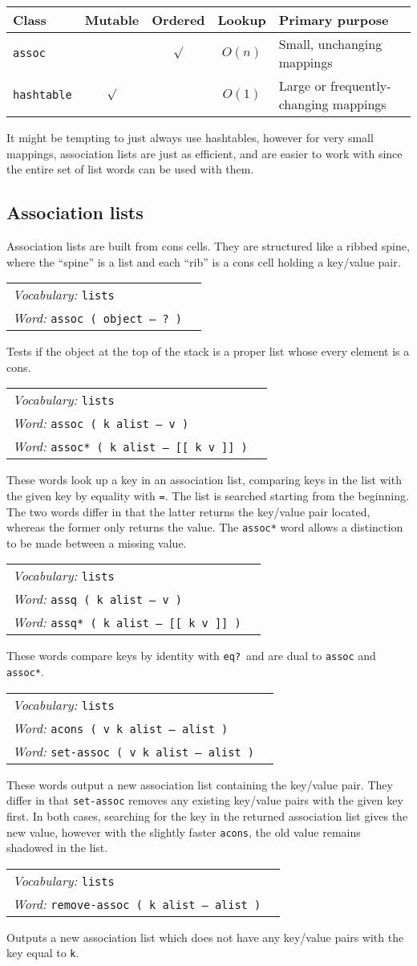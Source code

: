\documentclass{book}
\newcommand{\vocabulary}[1]{\emph{Vocabulary:} \texttt{#1}&\\}
\newcommand{\ordinaryword}[2]{\index{\texttt{#1}}\emph{Word:} \texttt{#2}&\\}
\newcommand{\wordtable}[1]{


\begin{tabularx}{12cm}{lX}
\hline
#1
\hline
\end{tabularx}

}
\begin{document}
\begin{tabular}[t]{l|c|c|c|l}
Class&Mutable&Ordered&Lookup&Primary purpose\\
\hline
\texttt{assoc}&&$\surd$&$O(n)$&Small, unchanging mappings\\
\texttt{hashtable}&$\surd$&&$O(1)$&Large or frequently-changing mappings
\end{tabular}

It might be tempting to just always use hashtables, however for very small mappings, association lists are just as efficient, and are easier to work with since the entire set of list words can be used with them.

\subsection{Association lists}


Association lists are built from cons cells. They are structured like a ribbed spine, where the ``spine'' is a list and each ``rib'' is a cons cell holding a key/value pair.

\wordtable{
\vocabulary{lists}
\ordinaryword{assoc?}{assoc ( object -- ?~)}
}
Tests if the object at the top of the stack is a proper list whose every element is a cons.

\wordtable{
\vocabulary{lists}
\ordinaryword{assoc}{assoc ( k alist -- v )}
\ordinaryword{assoc*}{assoc* ( k alist -- [[ k v ]] )}
}
These words look up a key in an association list, comparing keys in the list with the given key by equality with \texttt{=}. The list is searched starting from the beginning. The two words differ in that the latter returns the key/value pair located, whereas the former only returns the value. The \texttt{assoc*} word allows a distinction to be made between a missing value.
\wordtable{
\vocabulary{lists}
\ordinaryword{assq}{assq ( k alist -- v )}
\ordinaryword{assq*}{assq* ( k alist -- [[ k v ]] )}
}
These words compare keys by identity with \texttt{eq?}~and are dual to \texttt{assoc} and \texttt{assoc*}.
\wordtable{
\vocabulary{lists}
\ordinaryword{acons}{acons ( v k alist -- alist )}
\ordinaryword{set-assoc}{set-assoc ( v k alist -- alist )}
}
These words output a new association list containing the key/value pair.
They differ in that \texttt{set-assoc} removes any existing key/value pairs with the given key first. In both cases, searching for the key in the returned association list gives the new value, however with the slightly faster \texttt{acons}, the old value remains shadowed in the list.
\wordtable{
\vocabulary{lists}
\ordinaryword{remove-assoc}{remove-assoc ( k alist -- alist )}

}
Outputs a new association list which does not have any key/value pairs with the key equal to \texttt{k}.
\end{document}
